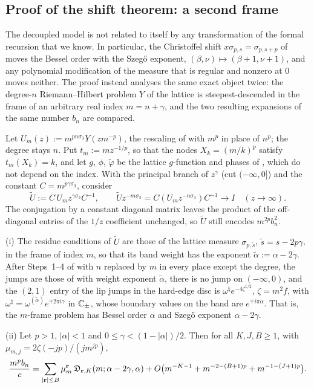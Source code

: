 \subsection{Proof of the shift theorem: a second frame}\label{sec:shift-proof}
The decoupled model is not related to itself by any transformation of the formal recursion that we know. In particular,
the Christoffel shift $x\sigma_{p,s}=\sigma_{p,s+p}$ of \cite{PaperII} moves the Bessel order with the Szeg\H{o} exponent,
$(\beta,\nu)\mapsto(\beta+1,\nu+1)$, and any polynomial modification of the measure that is regular and nonzero at $0$ moves
neither. The proof instead analyses the same exact object twice: the degree-$n$ Riemann--Hilbert problem $Y$ of the lattice
is steepest-descended in the frame of an arbitrary real index $m=n+\gamma$, and the two resulting expansions of the same
number $b_n$ are compared.

Let $U_m(z):=m^{pn\sigma_3}Y(zm^{-p})$, the rescaling of \cite{PaperII} with $m^p$ in place of $n^p$; the degree stays $n$. Put
$t_m:=mz^{-1/p}$, so that the nodes $X_k=(m/k)^p$ satisfy $t_m(X_k)=k$, and let $g$, $\phi$, $\tilde\varphi$ be the lattice
$g$-function and phases of \cite{PaperII}, which do not depend on the index. With the principal branch of $z^\gamma$ (cut
$(-\infty,0]$) and the constant $C=m^{p\gamma\sigma_3}$, consider
\[
  \tilde U:=C\,U_mz^{\gamma\sigma_3}C^{-1},\qquad \tilde Uz^{-m\sigma_3}=C(U_mz^{-n\sigma_3})C^{-1}\to I\quad(z\to\infty).
\]
The conjugation by a constant diagonal matrix leaves the product of the off-diagonal entries of the $1/z$ coefficient unchanged,
so $\tilde U$ still encodes $m^{2p}b_n^2$.

\begin{lemma}\label{lem:frame}
(i) The residue conditions of $\tilde U$ are those of the lattice measure $\sigma_{p,\tilde s}$, $\tilde s=s-2p\gamma$, in the frame
of index $m$, so that its band weight has the exponent $\tilde\alpha:=\alpha-2\gamma$. After Steps~1--4 of \cite[Section~5]{PaperII} with
$n$ replaced by $m$ in every place except the degree, the jumps are those of \cite{PaperII} with weight exponent $\tilde\alpha$, there
is no jump on $(-\infty,0)$, and the $(2,1)$ entry of the lip jumps in the hard-edge disc is $\omega^\natural e^{-4\zeta^{1/2}}$,
$\zeta=m^2f$, with $\omega^\natural=\omega^{(\tilde\alpha)}e^{\mp2\pi i\gamma}$ in $\mathbb{C}_\pm$, whose boundary values on the band are
$e^{\mp i\pi\alpha}$. That is, the $m$-frame problem has Bessel order $\alpha$ and Szeg\H{o} exponent $\alpha-2\gamma$.

(ii) Let $p>1$, $|\alpha|<1$ and $0\le\gamma<(1-|\alpha|)/2$. Then for all $K,J,B\ge1$, with $\mu_{m,j}=2\zeta(-jp)/(jm^{jp})$,
\[
  \frac{m^pb_n}c=\sum_{|\mathbf r|\le B}\mu_m^{\mathbf r}\,\mathfrak D_{\mathbf r,K}(m;\alpha-2\gamma,\alpha)+O\bigl(m^{-K-1}+m^{-2-(B+1)p}+m^{-1-(J+1)p}\bigr).
\]
\end{lemma}

